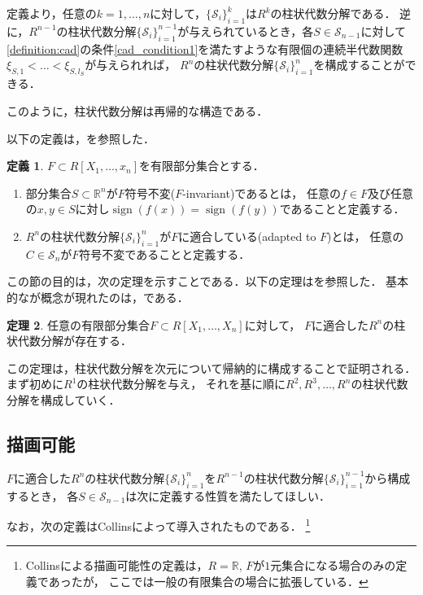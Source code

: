 \documentclass[uplatex, dvipdfmx]{jsarticle}
\numberwithin{equation}{section}
\newcommand{\R}{\mathbb{R}}
\newcommand{\calS}{\mathcal{S}}
\DeclareMathOperator{\sign}{sign}
\theoremstyle{definition}
\newtheorem{definition}{定義}[section]
\newtheorem{theorem}[definition]{定理}
\begin{document}
定義より，任意の$k=1, \dots, n$に対して，$\{\calS_i\}_{i=1}^k$は$R^k$の柱状代数分解である．
逆に，$R^{n-1}$の柱状代数分解$\{\calS_i\}_{i=1}^{n-1}$が与えられているとき，各$S \in \calS_{n-1}$に対して
\cref{definition:cad}の条件\ref{cad_condition1}を満たすような有限個の連続半代数関数$\xi_{S,1}<\dots<\xi_{S,l_S}$が与えられれば，
$R^n$の柱状代数分解$\{\calS_i\}_{i=1}^n$を構成することができる．

このように，柱状代数分解は再帰的な構造である．

以下の定義は，\cite[Definition 5.5]{MR2248869}を参照した．
\begin{definition}
     $F \subset R[X_1, \dots, x_n]$を有限部分集合とする．
     \begin{enumerate}
          \item 部分集合$S \subset \R^n$が$F$符号不変($F$-invariant)であるとは，
          任意の$f \in F$及び任意の$x,y \in S$に対し$\sign(f(x))=\sign(f(y))$であることと定義する．

          \item $R^n$の柱状代数分解$\{\calS_i\}_{i=1}^n$が$F$に適合している(adapted to $F$)とは，
          任意の$C \in \calS_n$が$F$符号不変であることと定義する．
     \end{enumerate}
\end{definition}

この節の目的は，次の定理を示すことである．以下の定理は\cite[Theorem 5.6]{MR2248869}を参照した．
基本的なが概念が現れたのは，\cite{MR0403962}である．
\begin{theorem} \label{theorem:cad}
     任意の有限部分集合$F \subset R[X_1, \dots, X_n]$に対して，
     $F$に適合した$R^n$の柱状代数分解が存在する．
\end{theorem}

この定理は，柱状代数分解を次元について帰納的に構成することで証明される．
まず初めに$R^1$の柱状代数分解を与え，
それを基に順に$R^2, R^3, \dots, R^n$の柱状代数分解を構成していく．

\subsection{描画可能}
$F$に適合した$R^n$の柱状代数分解$\{\calS_i\}_{i=1}^n$を$R^{n-1}$の柱状代数分解$\{\calS_i\}_{i=1}^{n-1}$から構成するとき，
各$S \in \calS_{n-1}$は次に定義する性質を満たしてほしい．

なお，次の定義はCollins\cite{MR0403962}によって導入されたものである．
\footnote{
     Collins\cite{MR0403962}による描画可能性の定義は，$R=\R$, $F$が$1$元集合になる場合のみの定義であったが，
     ここでは一般の有限集合の場合に拡張している．
}
\end{document}
